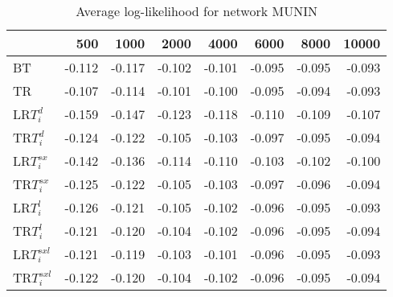 \begin{table}
 \begin{center}
 \begin{tabular}{lrrrrrrr}
 & 500 & 1000 & 2000 & 4000 & 6000 & 8000 & 10000\\\hline
BT & -0.112 & -0.117 & -0.102 & -0.101 & -0.095 & -0.095 & -0.093\\\hline
TR & -0.107 & -0.114 & -0.101 & -0.100 & -0.095 & -0.094 & -0.093\\\hline
LR$T_i^d$ & -0.159 & -0.147 & -0.123 & -0.118 & -0.110 & -0.109 & -0.107\\\hline
TR$T_i^d$ & -0.124 & -0.122 & -0.105 & -0.103 & -0.097 & -0.095 & -0.094\\\hline
LR$T_i^{sx}$ & -0.142 & -0.136 & -0.114 & -0.110 & -0.103 & -0.102 & -0.100\\\hline
TR$T_i^{sx}$ & -0.125 & -0.122 & -0.105 & -0.103 & -0.097 & -0.096 & -0.094\\\hline
LR$T_i^l$ & -0.126 & -0.121 & -0.105 & -0.102 & -0.096 & -0.095 & -0.093\\\hline
TR$T_i^l$ & -0.121 & -0.120 & -0.104 & -0.102 & -0.096 & -0.095 & -0.094\\\hline
LR$T_i^{sxl}$ & -0.121 & -0.119 & -0.103 & -0.101 & -0.096 & -0.095 & -0.093\\\hline
TR$T_i^{sxl}$ & -0.122 & -0.120 & -0.104 & -0.102 & -0.096 & -0.095 & -0.094\\\hline
\end{tabular}
\end{center}
\caption{Average log-likelihood for network MUNIN }
\label{Muninll}
\end{table}


